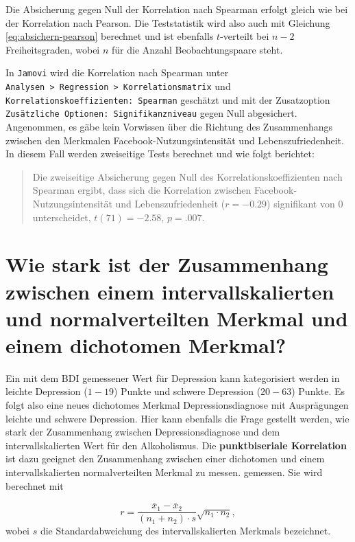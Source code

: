 \documentclass[
]{book}
\theoremstyle{definition}
\theoremstyle{definition}
\theoremstyle{definition}
\theoremstyle{definition}
\theoremstyle{remark}
\begin{document}
Die Absicherung gegen Null der Korrelation nach Spearman erfolgt gleich wie bei der Korrelation nach Pearson. Die Teststatistik wird also auch mit Gleichung \eqref{eq:absichern-pearson} berechnet und ist ebenfalls \(t\)-verteilt bei \(n-2\) Freiheitsgraden, wobei \(n\) für die Anzahl Beobachtungspaare steht.

In \texttt{Jamovi} wird die Korrelation nach Spearman unter \texttt{Analysen\ \textgreater{}\ Regression\ \textgreater{}\ Korrelationsmatrix} und \texttt{Korrelationskoeffizienten:\ Spearman} geschätzt und mit der Zusatzoption \texttt{Zusätzliche\ Optionen:\ Signifikanzniveau} gegen Null abgesichert. Angenommen, es gäbe kein Vorwissen über die Richtung des Zusammenhangs zwischen den Merkmalen Facebook-Nutzungsintensität und Lebenszufriedenheit. In diesem Fall werden zweiseitige Tests berechnet und wie folgt berichtet:

\begin{quote}
Die zweiseitige Absicherung gegen Null des Korrelationskoeffizienten nach Spearman ergibt, dass sich die Korrelation zwischen Facebook-Nutzungsintensität und Lebenszufriedenheit (\(r = -0.29\)) signifikant von \(0\) unterscheidet, \(t(71) = -2.58\), \(p = .007\).
\end{quote}

\section{Wie stark ist der Zusammenhang zwischen einem intervallskalierten und normalverteilten Merkmal und einem dichotomen Merkmal?}\label{wie-stark-ist-der-zusammenhang-zwischen-einem-intervallskalierten-und-normalverteilten-merkmal-und-einem-dichotomen-merkmal}

Ein mit dem BDI gemessener Wert für Depression kann kategorisiert werden in leichte Depression (\(1-19\)) Punkte und schwere Depression (\(20-63\)) Punkte. Es folgt also eine neues dichotomes Merkmal Depressionsdiagnose mit Ausprägungen leichte und schwere Depression. Hier kann ebenfalls die Frage gestellt werden, wie stark der Zusammenhang zwischen Depressionsdiagnose und dem intervallskalierten Wert für den Alkoholismus. \label{customdef-punktbiseriale-korrelation}{Die \textbf{punktbiseriale Korrelation} ist dazu geeignet den Zusammenhang zwischen einer dichotomen und einem intervallskalierten normalverteilten Merkmal zu messen.} gemessen. Sie wird berechnet mit

\[ r = \frac{\bar{x}_1- \bar{x}_2}{(n_1+n_2)\cdot s}\sqrt{n_1\cdot n_2},\]
wobei \(s\) die Standardabweichung des intervallskalierten Merkmals bezeichnet.
\end{document}
